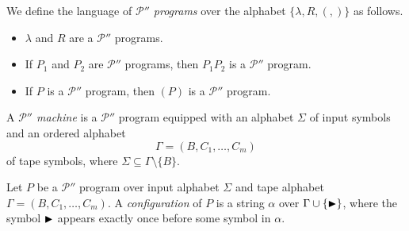 \begin{definition}
  We define the language of \emph{$\mathcal{P}''$ programs} over the alphabet
  $\{\lambda, R, (, )\}$ as follows.
  \begin{itemize}
    \item $\lambda$ and $R$ are a $\mathcal{P}''$ programs.
    \item If $P_1$ and $P_2$ are $\mathcal{P}''$ programs, then $P_1P_2$ is a
    $\mathcal{P}''$ program.
    \item If $P$ is a $\mathcal{P}''$ program, then $(P)$ is a $\mathcal{P}''$
    program.
  \end{itemize}
  A \emph{$\mathcal{P}''$ machine} is a $\mathcal{P}''$ program equipped with
  an alphabet $\Sigma$ of input symbols and an ordered alphabet
  \begin{equation*}
    \Gamma = (B, C_1, \dots, C_m)
  \end{equation*}
  of tape symbols, where $\Sigma \subseteq \Gamma \setminus \{B\}$.
\end{definition}

\begin{definition}
  Let $P$ be a $\mathcal{P}''$ program over input alphabet $\Sigma$ and tape
  alphabet $\Gamma = (B, C_1, \dots, C_m)$.
  A \emph{configuration} of $P$ is a string $\alpha$ over
  $\Gamma \cup \{\mathord{\blacktriangleright}\}$, where the symbol $\mathord{\blacktriangleright}$ appears exactly once before
  some symbol in $\alpha$.
\end{definition}